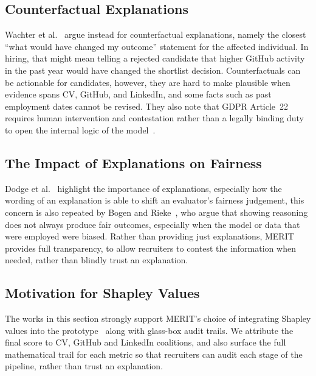 \subsection{Counterfactual Explanations}
Wachter et al.~\cite{wachter2017counterfactual} argue instead for counterfactual explanations, namely the closest
``what would have changed my outcome'' statement for the affected individual. In hiring, that might mean telling a rejected
candidate that higher GitHub activity in the past year would have changed the shortlist decision. Counterfactuals can be
actionable for candidates, however, they are hard to make plausible when evidence spans CV, GitHub, and LinkedIn, and some
facts such as past employment dates cannot be revised. They also note that GDPR Article~22 requires human intervention and
contestation rather than a legally binding duty to open the internal logic of the model~\cite{wachter2017counterfactual}.

\subsection{The Impact of Explanations on Fairness}
Dodge et al.~\cite{dodge2019explaining} highlight the importance of explanations, especially how the wording of an explanation is able
to shift an evaluator's fairness judgement, this concern is also repeated by Bogen and Rieke~\cite{bogen2018}, who 
argue that showing reasoning does not always produce fair outcomes, especially when the model or data that were employed were biased.
Rather than providing just explanations, MERIT provides full transparency, to allow recruiters to contest the information
when needed, rather than blindly trust an explanation.

\subsection{Motivation for Shapley Values}
The works in this section strongly support MERIT's choice of integrating Shapley values into the prototype~\cite{lundberg2017unified}
along with glass-box audit trails. We attribute the final score to CV, GitHub and LinkedIn coalitions, and also surface the 
full mathematical trail for each metric so that recruiters can audit each stage of the pipeline, rather than trust an explanation.


